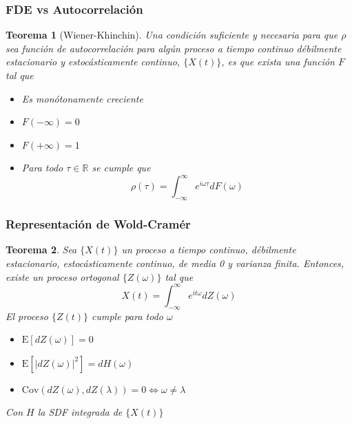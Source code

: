 \documentclass[serif,mathserif,professionalfont]{beamer}
\newtheorem{teorema}{Teorema}
\newcommand{\R}{\mathbb{R}}
\newcommand{\intR}{\int_{-\infty}^{\infty}}
\newcommand{\E}[1]{\mathrm{E}\left[ #1 \right]}
\newcommand{\Cov}[1]{\mathrm{Cov}\left( #1 \right)}
\newcommand{\abso}[1]{\left| #1 \right|}
\begin{document}

\begin{frame}\frametitle{FDE vs Autocorrelación}
\begin{teorema}[Wiener-Khinchin]
Una condici\'on suficiente y necesaria para que $\rho$ sea funci\'on de autocorrelaci\'on para 
alg\'un proceso a tiempo continuo d\'ebilmente estacionario y estoc\'asticamente continuo, 
$\{X(t)\}$,  es que exista una funci\'on $F$ tal que
\begin{itemize}
\item Es mon\'otonamente creciente
\item $F(-\infty) = 0$
\item $F(+\infty) = 1$
\item Para todo $\tau \in \R$ se cumple que
\begin{equation*}
\rho(\tau) = \intR e^{i \omega \tau} dF(\omega)
\end{equation*}
\end{itemize}
\end{teorema}
\end{frame}


\begin{frame}\frametitle{Representaci\'on de Wold-Cram\'er}
\begin{teorema}
Sea $\{X(t)\}$ un proceso a tiempo continuo, d\'ebilmente estacionario, estoc\'asticamente 
continuo, de media 0 y varianza finita. Entonces, existe un proceso ortogonal $\{Z(\omega)\}$ tal 
que
\begin{equation*}
X(t) = \intR e^{i t \omega} dZ(\omega)
\end{equation*}
El proceso $\{Z(t)\}$ cumple para todo $\omega$
\begin{itemize}
\item $\E{dZ(\omega)} = 0$
\item $\E{\abso{dZ(\omega)}^{2}} = dH(\omega)$
\item $\Cov{dZ(\omega),dZ(\lambda)} = 0 \Leftrightarrow \omega \neq \lambda$
\end{itemize}
Con $H$ la SDF integrada de $\{X(t)\}$
\end{teorema}
\end{frame}
\end{document}

